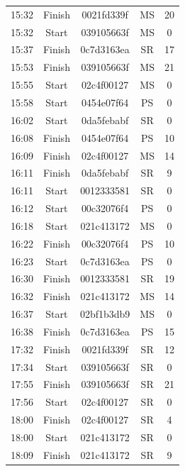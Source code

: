 \begin{table}[h]
\begin{tabular}{cc|cc|c}
15:32 & Finish  & 0021fd339f & MS  & 20 \\
15:32 & Start   & 039105663f & MS  & 0  \\
15:37 & Finish  & 0c7d3163ea & SR  & 17 \\
15:53 & Finish  & 039105663f & MS  & 21 \\
15:55 & Start   & 02c4f00127 & MS  & 0  \\
15:58 & Start   & 0454e07f64 & PS  & 0  \\
16:02 & Start   & 0da5febabf & SR  & 0  \\
16:08 & Finish  & 0454e07f64 & PS  & 10 \\
16:09 & Finish  & 02c4f00127 & MS  & 14 \\
16:11 & Finish  & 0da5febabf & SR  & 9  \\
16:11 & Start   & 0012333581 & SR  & 0  \\
16:12 & Start   & 00c32076f4 & PS  & 0  \\
16:18 & Start   & 021c413172 & MS  & 0  \\
16:22 & Finish  & 00c32076f4 & PS  & 10 \\
16:23 & Start   & 0c7d3163ea & PS  & 0  \\
16:30 & Finish  & 0012333581 & SR  & 19 \\
16:32 & Finish  & 021c413172 & MS  & 14 \\
16:37 & Start   & 02bf1b3db9 & MS  & 0  \\
16:38 & Finish  & 0c7d3163ea & PS  & 15 \\
17:32 & Finish  & 0021fd339f & SR  & 12 \\
17:34 & Start   & 039105663f & SR  & 0  \\
17:55 & Finish  & 039105663f & SR  & 21 \\
17:56 & Start   & 02c4f00127 & SR  & 0  \\
18:00 & Finish  & 02c4f00127 & SR  & 4  \\
18:00 & Start   & 021c413172 & SR  & 0  \\
18:09 & Finish  & 021c413172 & SR  & 9  \\
\end{tabular}
\end{table}


